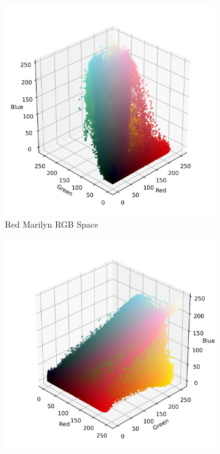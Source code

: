 \documentclass{article}
\begin{document}
\begin{figure}[ht]\ContinuedFloat
  \centering
  \begin{subfigure}{0.45\textwidth}
    \includegraphics[width=\textwidth]{main_files/figure-latex/4_7_red_marilyn_original_scatter.jpg}
    \caption{Red Marilyn RGB Space}
    \label{fig:4_7_red_marilyn_original_scatter}
  \end{subfigure}
  \hfill
  \begin{subfigure}{0.45\textwidth}
    \includegraphics[width=\textwidth]{main_files/figure-latex/4_8_red_marilyn_original_scatter.jpg}

\end{subfigure}
\end{figure}
\end{document}
